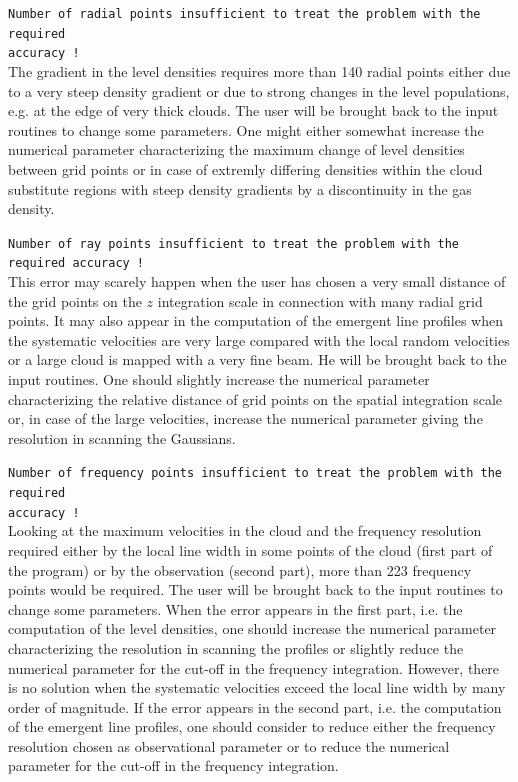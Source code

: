\begin{description}
\item{}{\tt Number of radial points insufficient to treat the problem
with the required\\ accuracy !} \\
The gradient in the level densities requires more than
140 radial points either due to a very steep density gradient or due
to strong changes in the level populations, e.g. at the edge
of very thick clouds. The user will be brought back to the
input routines to change some parameters. One might either 
somewhat increase the numerical parameter characterizing the
maximum change of level densities between grid points or in case
of extremly differing densities within the cloud substitute
regions with steep density gradients by a discontinuity in the gas
density.

\item{}{\tt Number of ray points insufficient to treat the problem
with the required accuracy !} \\
This error may scarely happen when
the user has chosen a very small distance of the grid points on
the $z$ integration scale in connection with many radial grid points.
It may also appear in the computation of the emergent line profiles
when the systematic velocities are very large compared with the local
random velocities or a large cloud is mapped with a very fine beam.
He will be brought back to the input routines. One should slightly
increase the numerical parameter characterizing the relative distance
of grid points on the spatial integration scale or, in case of
the large velocities, increase the numerical parameter giving the
resolution in scanning the Gaussians.

\item{}{\tt Number of frequency points insufficient to treat the problem
with the required\\ accuracy !}\\
Looking at the maximum velocities in 
the cloud and the frequency resolution required either by the local line 
width in some points of the cloud (first part of the program) or by the 
observation (second part), more than 223 frequency points would be required.
The user will be brought back to the input routines to change some 
parameters. When the error appears in the first part, i.e. the computation
of the level densities, one should increase the numerical parameter
characterizing the resolution in scanning the profiles or slightly
reduce the numerical parameter for the cut-off in the frequency 
integration. However, there is no solution when the systematic
velocities exceed the local line width by many order of magnitude.
If the error appears in the second part, i.e. the computation
of the emergent line profiles, one should consider to reduce either the
frequency resolution chosen as observational parameter or to reduce 
the numerical parameter for the cut-off in the frequency integration.


\end{description}
